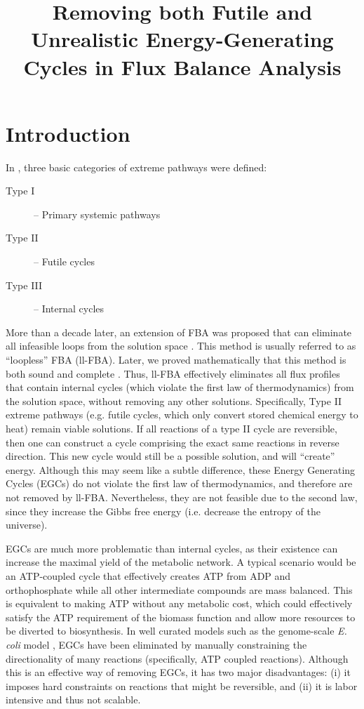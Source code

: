 \documentclass[twocolumn]{article}
\title{Removing both Futile and Unrealistic Energy-Generating Cycles in Flux Balance Analysis}
\begin{document}
\section*{Introduction}
In \cite{Schilling2000-rn, Beard2002-xt}, three basic categories of extreme pathways were defined:
\begin{description}
\item[Type I] -- Primary systemic pathways
\item[Type II] -- Futile cycles
\item[Type III] -- Internal cycles
\end{description}
More than a decade later, an extension of FBA was proposed that can eliminate all infeasible loops from the solution space \cite{Schellenberger2011-bq}. This method is usually referred to as ``loopless'' FBA (ll-FBA). Later, we proved mathematically that this method is both sound and complete \cite{Noor2012-qb}. Thus, ll-FBA effectively eliminates all flux profiles that contain internal cycles (which violate the first law of thermodynamics) from the solution space, without removing any other solutions. Specifically, Type II extreme pathways (e.g. futile cycles, which only convert stored chemical energy to heat) remain viable solutions. If all reactions of a type II cycle are reversible, then one can construct a cycle comprising the exact same reactions in reverse direction. This new cycle would still be a possible solution, and will ``create'' energy. Although this may seem like a subtle difference, these Energy Generating Cycles (EGCs) do not violate the first law of thermodynamics, and therefore are not removed by ll-FBA. Nevertheless, they are not feasible due to the second law, since they increase the Gibbs free energy (i.e. decrease the entropy of the universe).

EGCs are much more problematic than internal cycles, as their existence can increase the maximal yield of the metabolic network. A typical scenario would be an ATP-coupled cycle that effectively creates ATP from ADP and orthophosphate while all other intermediate compounds are mass balanced. This is equivalent to making ATP without any metabolic cost, which could effectively satisfy the ATP requirement of the biomass function and allow more resources to be diverted to biosynthesis. In well curated models such as the genome-scale \emph{E. coli} model \cite{Carrera2014-ys}, EGCs have been eliminated by manually constraining the directionality of many reactions (specifically, ATP coupled reactions). Although this is an effective way of removing EGCs, it has two major disadvantages: (i) it imposes hard constraints on reactions that might be reversible, and (ii) it is labor intensive and thus not scalable.
\end{document}
